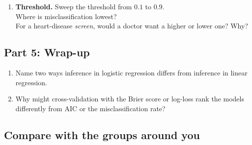 \documentclass{article}
\newcommand{\blankline}[1]{\underline{\hspace{#1}}}
\begin{document}
\begin{enumerate}[label={\bfseries (\Alph*)},itemsep=.7em]
Do the three losses agree on the best model? \blankline{1.5in} \; Which would you choose, and why? \\[3.5em]
\item \textbf{Threshold.} Sweep the threshold from $0.1$ to $0.9$. \\[0.3em] Where is misclassification lowest? \blankline{1in} \\[0.3em] For a heart-disease \emph{screen}, would a doctor want a higher or lower one? Why? \\[3.5em]
\end{enumerate}

\newpage

\subsection*{Part 5: Wrap-up}

\begin{enumerate}[label={\bfseries (\Alph*)},itemsep=.8em]
\item Name two ways inference in logistic regression differs from inference in linear regression. \\[4em]
\item Why might cross-validation with the Brier score or log-loss rank the models differently from AIC or the misclassification rate? \\[4em]
\end{enumerate}

\subsection*{Compare with the groups around you}

\noindent{}
\end{document}
